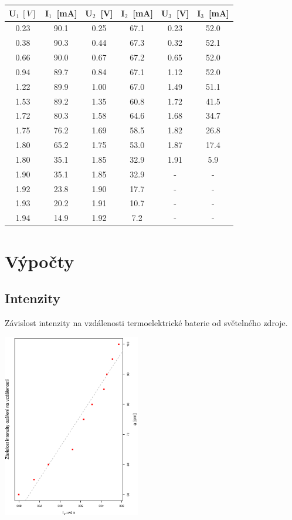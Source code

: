 \documentclass[10pt]{article}
\begin{document}
\begin{scriptsize}
\begin{minipage}[t]{.5\textwidth}
\begin{tabular}[b]{|c|c|c|c|c|c|}
\hline
U$_1~[V]$ & I$_1$~[mA] & U$_2$~[V] & I$_2$~[mA] & U$_3$~[V] & I$_3$~[mA] \\
\hline
0.23 & 90.1 & 0.25 & 67.1 & 0.23 & 52.0 \\
0.38 & 90.3 & 0.44 & 67.3 & 0.32 & 52.1 \\
0.66 & 90.0 & 0.67 & 67.2 & 0.65 & 52.0 \\
0.94 & 89.7 & 0.84 & 67.1 & 1.12 & 52.0 \\
1.22 & 89.9 & 1.00 & 67.0 & 1.49 & 51.1 \\
1.53 & 89.2 & 1.35 & 60.8 & 1.72 & 41.5 \\
1.72 & 80.3 & 1.58 & 64.6 & 1.68 & 34.7 \\
1.75 & 76.2 & 1.69 & 58.5 & 1.82 & 26.8 \\
1.80 & 65.2 & 1.75 & 53.0 & 1.87 & 17.4 \\
1.80 & 35.1 & 1.85 & 32.9 & 1.91 & 5.9 \\
1.90 & 35.1 & 1.85 & 32.9 & - & - \\
1.92 & 23.8 & 1.90 & 17.7 & - & - \\
1.93 & 20.2 & 1.91 & 10.7 & - & - \\
1.94 & 14.9 & 1.92 & 7.2 & - & - \\
\hline
\end{tabular}
\end{minipage}
\end{scriptsize}

\section{Výpočty}
\subsection{Intenzity}
Závislost intenzity na vzdálenosti termoelektrické baterie od světelného zdroje.
\begin{center}
\includegraphics[width=6cm,angle=270]{graf0.eps} \\[1cm]
\end{center}
\end{document}

